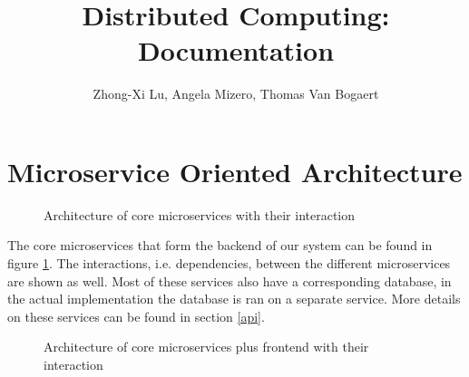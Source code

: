 \documentclass{article}
\title{Distributed Computing: Documentation}
\author{Zhong-Xi Lu, Angela Mizero, Thomas Van Bogaert}
\date{}
\begin{document}
\maketitle

\section{Microservice Oriented Architecture}

\begin{figure}[H]
    \begin{center}
    \end{center}
    \caption{Architecture of core microservices with their interaction}
    \label{fig:arch}
\end{figure}

The core microservices that form the backend of our system can be found in figure \ref{fig:arch}. The interactions, i.e. dependencies, between the different microservices are shown as well. Most of these services also have a corresponding database, in the actual implementation the database is ran on a separate service. More details on these services can be found in section \ref{api}.

\begin{figure}[H]
    \begin{center}
    \end{center}
    \caption{Architecture of core microservices plus frontend with their interaction}
    \label{fig:arch_frontend}
\end{figure}
\end{document}
